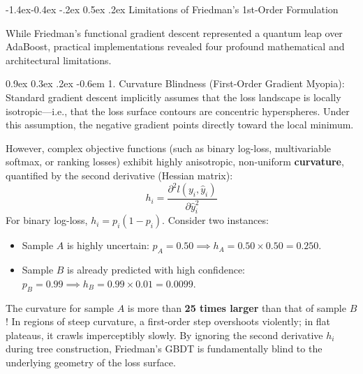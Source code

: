 \documentclass[11pt,a4paper]{article}
\makeatletter
\renewcommand\subsection{\@startsection{subsection}{2}{\z@}%
                                     {-1.4ex\@plus -0.4ex \@minus -.2ex}%
                                     {0.5ex \@plus .2ex}%
                                     {\normalfont\normalsize\bfseries}}
\renewcommand\paragraph{\@startsection{paragraph}{4}{\z@}%
                                     {0.9ex \@plus0.3ex \@minus.2ex}%
                                     {-0.6em}%
                                     {\normalfont\normalsize\bfseries}}
\makeatother
\begin{document}
\subsection{Limitations of Friedman's 1st-Order Formulation}
\label{sec:friedman_limitations}

While Friedman's functional gradient descent represented a quantum leap over AdaBoost, practical implementations revealed four profound mathematical and architectural limitations.

\paragraph{1. Curvature Blindness (First-Order Gradient Myopia):}
Standard gradient descent implicitly assumes that the loss landscape is locally isotropic---i.e., that the loss surface contours are concentric hyperspheres. Under this assumption, the negative gradient points directly toward the local minimum.

However, complex objective functions (such as binary log-loss, multivariable softmax, or ranking losses) exhibit highly anisotropic, non-uniform \textbf{curvature}, quantified by the second derivative (Hessian matrix):
\begin{equation}
    h_i = \frac{\partial^2 l(y_i, \hat{y}_i)}{\partial \hat{y}_i^2}
\end{equation}
For binary log-loss, $h_i = p_i(1 - p_i)$. Consider two instances:
\begin{itemize}
    \item Sample $A$ is highly uncertain: $p_A = 0.50 \implies h_A = 0.50 \times 0.50 = 0.250$.
    \item Sample $B$ is already predicted with high confidence: $p_B = 0.99 \implies h_B = 0.99 \times 0.01 = 0.0099$.
\end{itemize}
The curvature for sample $A$ is more than \textbf{25 times larger} than that of sample $B$! In regions of steep curvature, a first-order step overshoots violently; in flat plateaus, it crawls imperceptibly slowly. By ignoring the second derivative $h_i$ during tree construction, Friedman's GBDT is fundamentally blind to the underlying geometry of the loss surface.
\end{document}
